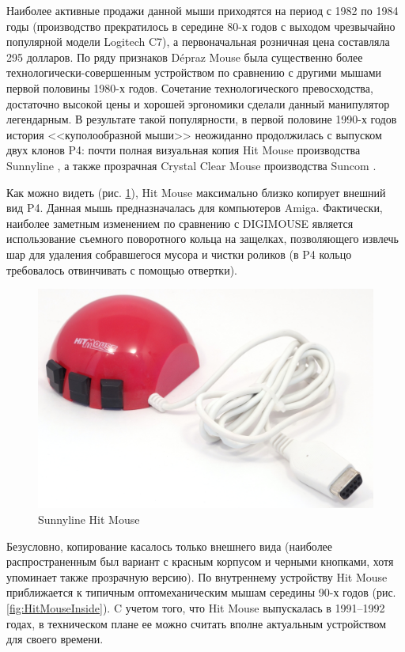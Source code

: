 \documentclass[11pt, a4paper]{article}
\begin{document}
Наиболее активные продажи данной мыши приходятся на период с 1982 по 1984 годы (производство прекратилось в середине 80-х годов с выходом чрезвычайно популярной модели Logitech C7), а первоначальная розничная цена составляла 295 долларов. По ряду признаков Dépraz Mouse была существенно более технологически-совершенным устройством по сравнению с другими мышами первой половины 1980-х годов. Сочетание технологического превосходства, достаточно высокой цены и хорошей эргономики сделали данный манипулятор легендарным. В результате такой популярности, в первой половине 1990-х годов история <<куполообразной мыши>> неожиданно продолжилась с выпуском двух клонов P4: почти полная визуальная копия Hit Mouse производства Sunnyline \cite{sunnyline}, а также прозрачная Crystal Clear Mouse производства Suncom \cite{suncom}.

Как можно видеть (рис. \ref{fig:HitMousePic}), Hit Mouse максимально близко копирует внешний вид P4. Данная мышь предназначалась для компьютеров Amiga. Фактически, наиболее заметным изменением по сравнению с DIGIMOUSE является использование съемного поворотного кольца на защелках, позволяющего извлечь шар для удаления собравшегося мусора и чистки роликов (в P4 кольцо требовалось отвинчивать с помощью отвертки).

\begin{figure}[h]
   \centering
    \includegraphics[scale=0.5]{1982_depraz_digimouse/hitmouse_pic_30.jpg}
    \caption{Sunnyline Hit Mouse}
    \label{fig:HitMousePic}
\end{figure}

Безусловно, копирование касалось только внешнего вида (наиболее распространенным был вариант с красным корпусом и черными кнопками, хотя \cite{sunnyline} упоминает также прозрачную версию). По внутреннему устройству Hit Mouse приближается к типичным оптомеханическим мышам середины 90-х годов (рис. \ref{fig:HitMouseInside}). C учетом того, что Hit Mouse выпускалась в 1991--1992 годах, в техническом плане ее можно считать вполне актуальным устройством для своего времени.
\end{document}
